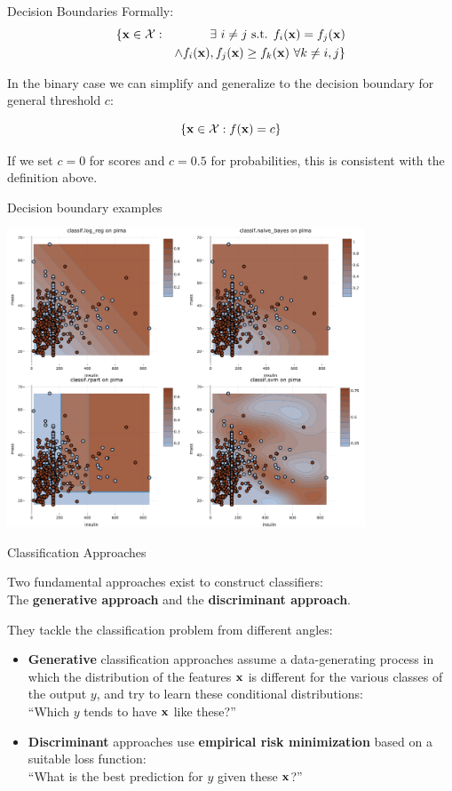 \documentclass[11pt,compress,t,notes=noshow, xcolor=table]{beamer}
\begin{document}
\begin{vbframe}{Decision Boundaries}
Formally:
\begin{eqnarray*}
\{ \xv \in \Xspace: && \exists~i \ne j \text{ s.t. } \fkx[i] = \fkx[j] \\ && \land \fkx[i], \fkx[j] \ge \fkx[k] ~ \forall k \ne i, j\}
\end{eqnarray*}  
  
In the binary case we can simplify and generalize to the decision boundary for general threshold $c$:

$$
    \{ \xv \in \Xspace : \fx = c \}
$$

If we set $c=0$ for scores and $c=0.5$ for probabilities, this is consistent with the definition above.

\end{vbframe}


\begin{vbframe}{Decision boundary examples}

{\centering 
\includegraphics[width=0.80\textwidth]{figure/db_examples.png} 
}

\end{vbframe}

\begin{vbframe}{Classification Approaches}

  Two fundamental approaches exist to construct classifiers:\\
  The \textbf{generative approach} and the \textbf{discriminant approach}.

\lz
They tackle the classification problem from different angles:

\begin{itemize}
\item \textbf{Generative} classification approaches assume a data-generating process in which the distribution of the features $\xv$ is different for the various classes of the output $y$, and try to learn these conditional distributions:\\ \enquote{Which $y$ tends to have $\xv$ like these?}
\lz
\item \textbf{Discriminant} approaches use \textbf{empirical risk minimization} based on a suitable loss function:\\ \enquote{What is the best prediction for $y$ given these $\xv$?}
\end{itemize}
\end{vbframe}
\end{document}
